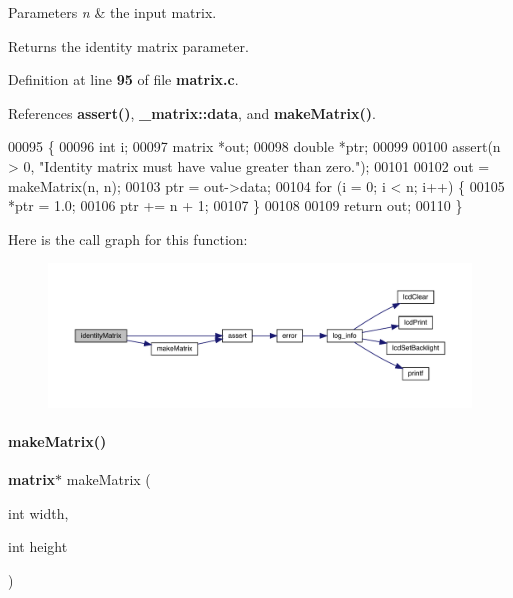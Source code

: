 \begin{DoxyParams}{Parameters}
{\em n} & the input matrix. \\
\hline
\end{DoxyParams}
\begin{DoxyReturn}{Returns}
the identity matrix parameter. 
\end{DoxyReturn}


Definition at line \textbf{ 95} of file \textbf{ matrix.\+c}.



References \textbf{ assert()}, \textbf{ \+\_\+matrix\+::data}, and \textbf{ make\+Matrix()}.


\begin{DoxyCode}
00095                               \{
00096   \textcolor{keywordtype}{int} i;
00097   matrix *out;
00098   \textcolor{keywordtype}{double} *ptr;
00099 
00100   assert(n > 0, \textcolor{stringliteral}{"Identity matrix must have value greater than zero."});
00101 
00102   out = makeMatrix(n, n);
00103   ptr = out->data;
00104   \textcolor{keywordflow}{for} (i = 0; i < n; i++) \{
00105     *ptr = 1.0;
00106     ptr += n + 1;
00107   \}
00108 
00109   \textcolor{keywordflow}{return} out;
00110 \}
\end{DoxyCode}
Here is the call graph for this function\+:
\nopagebreak
\begin{figure}[H]
\begin{center}
\leavevmode
\includegraphics[width=350pt]{matrix_8c_aa3f5e409b1641373be7cf7284e216d1a_cgraph}
\end{center}
\end{figure}
\mbox{\label{matrix_8c_aae8b56c6fb44d9147b835f4006ca872c}} 
\paragraph{make\+Matrix()}
{\footnotesize\ttfamily \textbf{ matrix}$\ast$ make\+Matrix (\begin{DoxyParamCaption}\item[{int}]{width,  }\item[{int}]{height }\end{DoxyParamCaption})}



